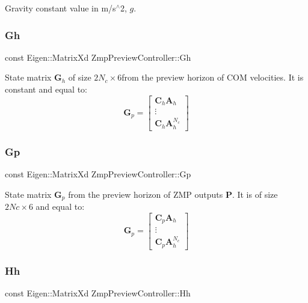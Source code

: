 Gravity constant value in m/s$^\wedge$2, $ g $. \hypertarget{classZmpPreviewController_a9429cb06fdd2c3ca5036a2fd48303632}{}\label{classZmpPreviewController_a9429cb06fdd2c3ca5036a2fd48303632} 
\subsubsection{\texorpdfstring{Gh}{Gh}}
{\footnotesize\ttfamily const Eigen\+::\+Matrix\+Xd Zmp\+Preview\+Controller\+::\+Gh\hspace{0.3cm}{\ttfamily [private]}}

State matrix $\mathbf{G}_h$ of size $2N_c \times 6$from the preview horizon of C\+OM velocities. It is constant and equal to\+: \[ \mathbf{G}_p = \left[\begin{array}{c} \mathbf{C}_h\mathbf{A}_h \\ \vdots \\ \mathbf{C}_h\mathbf{A}^{N_c}_h \end{array}\right] \] \hypertarget{classZmpPreviewController_a53a7d8af5be4a5d5cea99fad2ea48979}{}\label{classZmpPreviewController_a53a7d8af5be4a5d5cea99fad2ea48979} 
\subsubsection{\texorpdfstring{Gp}{Gp}}
{\footnotesize\ttfamily const Eigen\+::\+Matrix\+Xd Zmp\+Preview\+Controller\+::\+Gp\hspace{0.3cm}{\ttfamily [private]}}

State matrix $\mathbf{G}_p$ from the preview horizon of Z\+MP outputs $\mathbf{P}$. It is of size $2Nc \times 6$ and equal to\+: \[ \mathbf{G}_p = \left[\begin{array}{c} \mathbf{C}_p\mathbf{A}_h \\ \vdots \\ \mathbf{C}_p\mathbf{A}^{N_c}_h \end{array}\right] \] \hypertarget{classZmpPreviewController_a8caaf8bf8f06e5b0b53d2cd5c131eefd}{}\label{classZmpPreviewController_a8caaf8bf8f06e5b0b53d2cd5c131eefd} 
\subsubsection{\texorpdfstring{Hh}{Hh}}
{\footnotesize\ttfamily const Eigen\+::\+Matrix\+Xd Zmp\+Preview\+Controller\+::\+Hh\hspace{0.3cm}{\ttfamily [private]}}


